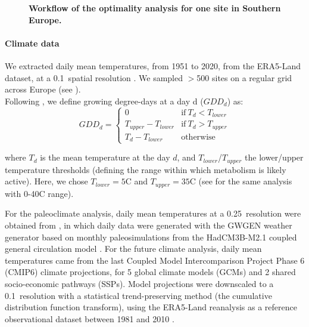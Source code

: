 \documentclass[11pt,letter]{article}
\begin{document}
\begin{figure}[h]
	\vspace*{0.3cm}
	\caption{\textbf{Workflow of the optimality analysis for one site in Southern Europe.}}
	\label{fig:method}
\end{figure}

\paragraph{Climate data}
We extracted daily mean temperatures, from 1951 to 2020, from the ERA5-Land dataset, at a 0.1\degree~spatial resolution \citep{MunozSabater2021}. We sampled $>$500 sites on a regular grid across Europe (see ).\\
Following \citet{McMaster1997}, we define growing degree-days at a day d ($GDD_d$) as:
\begin{equation}
	GDD_d =
	\begin{cases}
		0 & \text{if}~T_d<T_{lower}\\
		T_{upper}-T_{lower} & \text{if}~T_d>T_{upper}\\
		T_d-T_{lower} & \text{otherwise}
	\end{cases}       
\end{equation}

\noindent where $T_d$ is the mean temperature at the day $d$, and $T_{lower}$/$T_{upper}$ the lower/upper temperature thresholds (defining the range within which metabolism is likely active). Here, we chose $T_{lower}=5$\degree C and $T_{upper}=35$\degree C (see  for the same analysis with 0-40\degree C range). 

For the paleoclimate analysis, daily mean temperatures at a 0.25\degree~resolution were obtained from \citet{VanderMeersch2024}, in which daily data were generated with the GWGEN weather generator \citep{Sommer2017} based on monthly paleosimulations from the HadCM3B-M2.1 coupled general circulation model \citep{Armstrong2019}. For the future climate analysis, daily mean temperatures came from the last Coupled Model Intercomparison Project Phase 6 (CMIP6) climate  projections, for 5 global climate models (GCMs) and 2 shared socio-economic pathways (SSPs). Model projections were downscaled to a 0.1\degree~resolution with a statistical trend-preserving method (the cumulative distribution function transform), using the ERA5-Land reanalysis as a reference observational dataset between 1981 and 2010 \citep{Noel2022}. 
\end{document}
